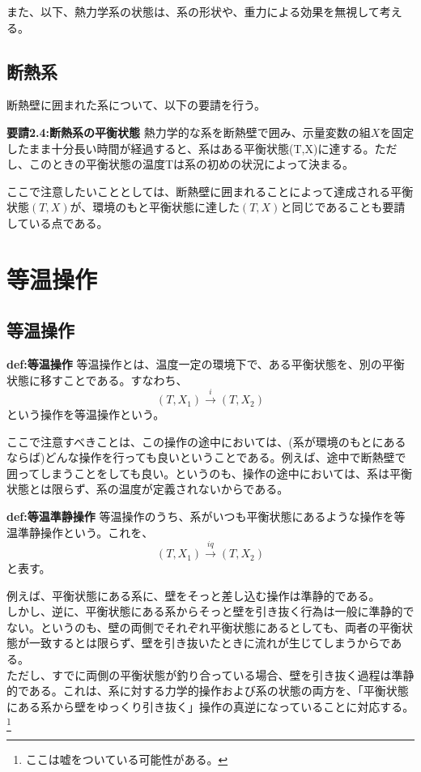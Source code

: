 \documentclass[a4paper,11pt]{jsarticle}
\begin{document}
また、以下、熱力学系の状態は、系の形状や、重力による効果を無視して考える。\\

\subsection{断熱系}
断熱壁に囲まれた系について、以下の要請を行う。
\begin{itembox}[l]{\textbf{要請2.4:断熱系の平衡状態}}
    熱力学的な系を断熱壁で囲み、示量変数の組$X$を固定したまま十分長い時間が経過すると、系はある平衡状態(T,X)に達する。ただし、このときの平衡状態の温度Tは系の初めの状況によって決まる。
\end{itembox}
ここで注意したいこととしては、断熱壁に囲まれることによって達成される平衡状態$(T,X)$が、環境のもと平衡状態に達した$(T,X)$と同じであることも要請している点である。\\

\section{等温操作}
\subsection{等温操作}

\begin{itembox}[l]{\textbf{def:等温操作}}
    等温操作とは、温度一定の環境下で、ある平衡状態を、別の平衡状態に移すことである。すなわち、
    \begin{equation}
        (T,X_1) \xrightarrow{i} (T,X_2)
    \end{equation}
    という操作を等温操作という。
\end{itembox}
ここで注意すべきことは、この操作の途中においては、(系が環境のもとにあるならば)どんな操作を行っても良いということである。例えば、途中で断熱壁で囲ってしまうことをしても良い。というのも、操作の途中においては、系は平衡状態とは限らず、系の温度が定義されないからである。\\

\begin{itembox}[l]{\textbf{def:等温準静操作}}
    等温操作のうち、系がいつも平衡状態にあるような操作を等温準静操作という。これを、
    \begin{equation}
        (T,X_1) \xrightarrow{iq} (T,X_2)
    \end{equation}
    と表す。
\end{itembox}
例えば、平衡状態にある系に、壁をそっと差し込む操作は準静的である。\\
しかし、逆に、平衡状態にある系からそっと壁を引き抜く行為は一般に準静的でない。というのも、壁の両側でそれぞれ平衡状態にあるとしても、両者の平衡状態が一致するとは限らず、壁を引き抜いたときに流れが生じてしまうからである。\\
ただし、すでに両側の平衡状態が釣り合っている場合、壁を引き抜く過程は準静的である。これは、系に対する力学的操作および系の状態の両方を、「平衡状態にある系から壁をゆっくり引き抜く」操作の真逆になっていることに対応する。\footnote{ここは嘘をついている可能性がある。}\\
\end{document}
